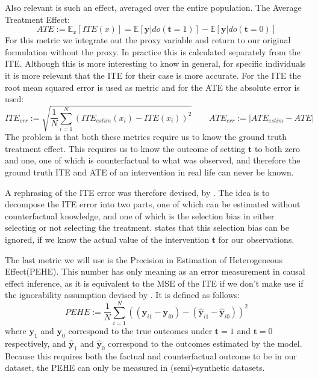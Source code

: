 \documentclass{report}
\newcommand{\E}{\mathbb{E}}
\newcommand{\bt}{\mathbf{t}}
\newcommand{\bX}{\mathbf{X}}
\newcommand{\by}{\mathbf{y}}
\begin{document}
Also relevant is such an effect, averaged over the entire population. The Average Treatment Effect:
\begin{equation}\label{equation:ATE}
    ATE := \E_x[ITE(x)] = \E[\by | do(\bt=1)] - \E[\by | do(\bt=0)]
\end{equation}
For this metric we integrate out the proxy variable and return to our original formulation without the proxy. In practice this is calculated separately from the ITE. Although this is more interesting to know in general, for specific individuals it is more relevant that the ITE for their case is more accurate. For the ITE the root mean squared error is used as metric and for the ATE the absolute error is used:
\begin{equation}
    ITE_{err} := \sqrt{\frac{1}{N} \sum\limits^N_{i=1}\left(ITE_{estim}(x_i) - ITE(x_i)\right)^2} \qquad ATE_{err} := \left| ATE_{estim} - ATE\right|
\end{equation}
The problem is that both these metrics require us to know the ground truth treatment effect. This requires us to know the outcome of setting $\bt$ to both zero and one, one of which is counterfactual to what was observed, and therefore the ground truth ITE and ATE of an intervention in real life can never be known. 

A rephrasing of the ITE error was therefore devised, by \textcite{jaeger2005ignorability}. The idea is to decompose the ITE error into two parts, one of which can be estimated without counterfactual knowledge, and one of which is the selection bias in either selecting or not selecting the treatment. \textcite{jaeger2005ignorability} states that this selection bias can be ignored, if we know the actual value of the intervention $\bt$ for our observations.

The last metric we will use is the Precision in Estimation of Heterogeneous Effect(PEHE). This number has only meaning as an error measurement in causal effect inference, as it is equivalent to the MSE of the ITE if we don't make use if the ignorability assumption devised by \textcite{jaeger2005ignorability}. It is defined as follows:
\begin{equation}
    PEHE := \frac{1}{N}\sum\limits^N_{i=1}((\by_{i1} - \by_{i0}) - (\hat{\by}_{i1} - \hat{\by}_{i0}))^2    
\end{equation}
where $\by_1$ and $\by_0$ correspond to the true outcomes under $\bt=1$ and $\bt=0$ respectively, and $\hat{\by}_1$ and $\hat{\by}_0$ correspond to the outcomes estimated by the model. Because this requires both the factual and counterfactual outcome to be in our dataset, the PEHE can only be measured in (semi)-synthetic datasets.
\end{document}
